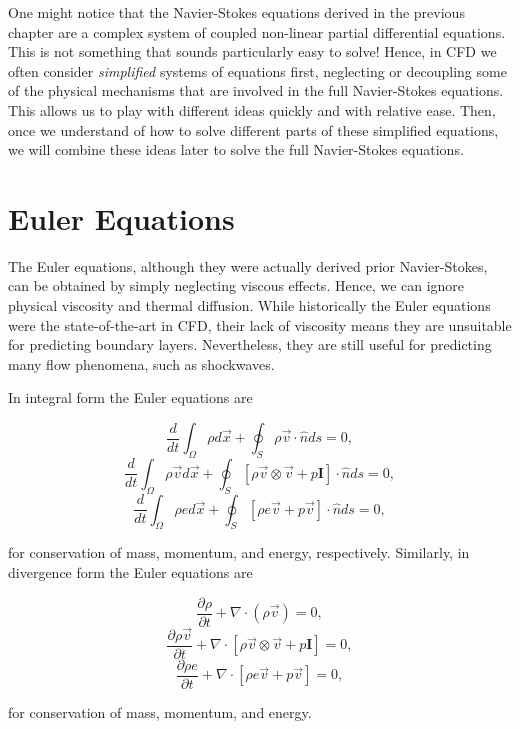 One might notice that the Navier-Stokes equations derived in the previous chapter are a complex system of coupled non-linear partial differential equations. This is not something that sounds particularly easy to solve! Hence, in CFD we often consider {\it simplified} systems of equations first, neglecting or decoupling some of the physical mechanisms that are involved in the full Navier-Stokes equations. This allows us to play with different ideas quickly and with relative ease. Then, once we understand of how to solve different parts of these simplified equations, we will combine these ideas later to solve the full Navier-Stokes equations. 

\section{Euler Equations}
The Euler equations, although they were actually derived prior Navier-Stokes, can be obtained by simply neglecting viscous effects. Hence, we can ignore physical viscosity and thermal diffusion. While historically the Euler equations were the state-of-the-art in CFD, their lack of viscosity means they are unsuitable for predicting boundary layers. Nevertheless, they are still useful for predicting many flow phenomena, such as shockwaves.

In integral form the Euler equations are
\begin{eqBox}
\begin{equation}
	 \frac{d}{dt}\int_\Omega \rho d\vec{x} + \oint_S \rho \vec{v} \cdot \hat{n} ds = 0,
\end{equation}
\begin{equation}
	\frac{d}{dt}\int_\Omega \rho \vec{v} d\vec{x} + \oint_S \left[ \rho \vec{v} \otimes \vec{v} + p \mathbf{I} \right]\cdot \hat{n} ds =  0,
\end{equation}
\begin{equation}
	\frac{d}{dt}\int_\Omega \rho e d\vec{x} + \oint_S \left[ \rho e \vec{v} + p\vec{v} \right] \cdot \hat{n} ds = 0,
\end{equation}
\end{eqBox}
for conservation of mass, momentum, and energy, respectively. Similarly, in divergence form the Euler equations are
\begin{eqBox}
\begin{equation}
	 \frac{\partial \rho}{\partial t} + \nabla \cdot (\rho \vec{v}) = 0,
\end{equation}
\begin{equation}
	\frac{\partial \rho \vec{v}}{\partial t} + \nabla \cdot \left[ \rho \vec{v} \otimes \vec{v} + p \mathbf{I} \right] =  0,
\end{equation}
\begin{equation}
	\frac{\partial \rho e}{\partial t} + \nabla \cdot \left[ \rho e \vec{v} + p\vec{v} \right] = 0,
\end{equation}
\end{eqBox}
for conservation of mass, momentum, and energy.


